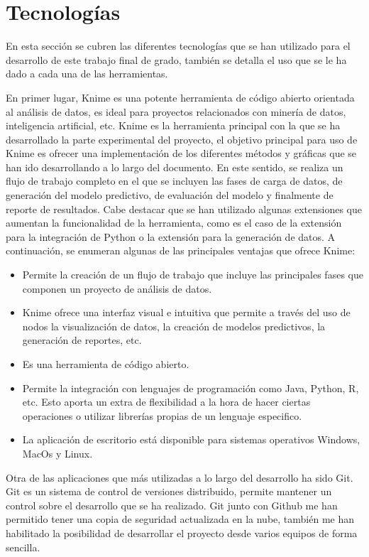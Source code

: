 \section{Tecnologías}

En esta sección se cubren las diferentes tecnologías que se han utilizado para el desarrollo de este trabajo final de grado, también se detalla el uso que se le ha dado a cada una de las herramientas. 

\bigbreak

En primer lugar, Knime es una potente herramienta de código abierto orientada al análisis de datos, es ideal para proyectos relacionados con minería de datos, inteligencia artificial, etc. Knime es la herramienta principal con la que se ha desarrollado la parte experimental del proyecto, el objetivo principal para uso de Knime es ofrecer una implementación de los diferentes métodos y gráficas que se han ido desarrollando a lo largo del documento. En este sentido, se realiza un flujo de trabajo completo en el que se incluyen las fases de carga de datos, de generación del modelo predictivo, de evaluación del modelo y finalmente de reporte de resultados. Cabe destacar que se han utilizado algunas extensiones que aumentan la funcionalidad de la herramienta, como es el caso de la extensión para la integración de Python o la extensión para la generación de datos. A continuación, se enumeran algunas de las principales ventajas que ofrece Knime:

\begin{itemize}
    \item Permite la creación de un flujo de trabajo que incluye las principales fases que componen un proyecto de análisis de datos. 
    \item Knime ofrece una interfaz visual e intuitiva que permite a través del uso de nodos la visualización de datos, la creación de modelos predictivos, la generación de reportes, etc.
    \item Es una herramienta de código abierto.
    \item Permite la integración con lenguajes de programación como Java, Python, R, etc. Esto aporta un extra de flexibilidad a la hora de hacer ciertas operaciones o utilizar librerías propias de un lenguaje especifico.
    \item La aplicación de escritorio está disponible para sistemas operativos Windows, MacOs y Linux.
\end{itemize}

\bigbreak

Otra de las aplicaciones que más utilizadas a lo largo del desarrollo ha sido Git. Git es un sistema de control de versiones distribuido, permite mantener un control sobre el desarrollo que se ha realizado. Git junto con Github me han permitido tener una copia de seguridad actualizada en la nube, también me han habilitado la posibilidad de desarrollar el proyecto desde varios equipos de forma sencilla.

\clearpage